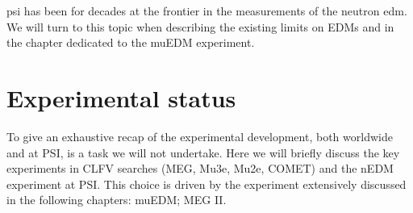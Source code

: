 \begin{refsection}
    \gls{psi} has been for decades at the frontier in the measurements of the neutron \gls{edm}.
    We will turn to this topic when describing the existing limits on EDMs and in the chapter dedicated to the muEDM experiment.\\
    \cite{edmasprobe}

\section{Experimental status}
    To give an exhaustive recap of the experimental development, both worldwide and at PSI, is a task we will not undertake. 
    Here we will briefly discuss the key experiments in CLFV searches (MEG, Mu3e, Mu2e, COMET) and the nEDM experiment at PSI.
    This choice is driven by the experiment extensively discussed in the following chapters: muEDM; MEG II.


\end{refsection}
